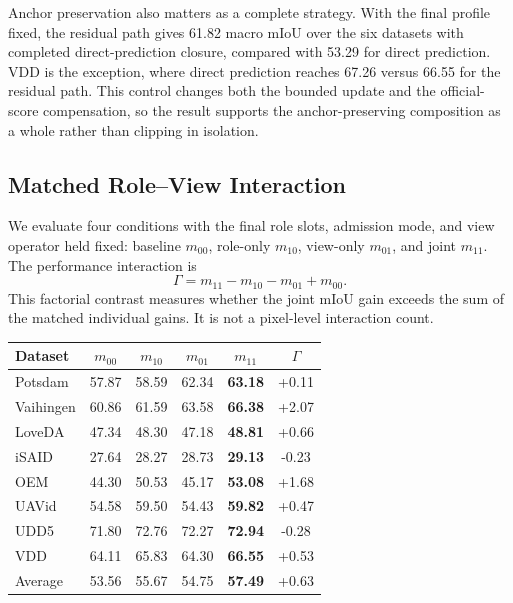 Anchor preservation also matters as a complete strategy. With the final profile fixed, the residual path gives 61.82 macro mIoU over the six datasets with completed direct-prediction closure, compared with 53.29 for direct prediction. VDD is the exception, where direct prediction reaches 67.26 versus 66.55 for the residual path. This control changes both the bounded update and the official-score compensation, so the result supports the anchor-preserving composition as a whole rather than clipping in isolation.

\subsection{Matched Role--View Interaction}

We evaluate four conditions with the final role slots, admission mode, and view operator held fixed: baseline $m_{00}$, role-only $m_{10}$, view-only $m_{01}$, and joint $m_{11}$. The performance interaction is
\begin{equation}
\Gamma=m_{11}-m_{10}-m_{01}+m_{00}.
\label{eq:interaction}
\end{equation}
This factorial contrast measures whether the joint mIoU gain exceeds the sum of the matched individual gains. It is not a pixel-level interaction count.

\begin{center}
\centering
\captionsetup{hypcap=false}
\label{tab:interaction}
\captionsetup{hypcap=true}
\small
\setlength{\tabcolsep}{3.5pt}
\begin{tabular}{lccccc}
\toprule
Dataset & $m_{00}$ & $m_{10}$ & $m_{01}$ & $m_{11}$ & $\Gamma$ \\
\midrule
Potsdam & 57.87 & 58.59 & 62.34 & \textbf{63.18} & +0.11 \\
Vaihingen & 60.86 & 61.59 & 63.58 & \textbf{66.38} & +2.07 \\
LoveDA & 47.34 & 48.30 & 47.18 & \textbf{48.81} & +0.66 \\
iSAID & 27.64 & 28.27 & 28.73 & \textbf{29.13} & -0.23 \\
OEM & 44.30 & 50.53 & 45.17 & \textbf{53.08} & +1.68 \\
UAVid & 54.58 & 59.50 & 54.43 & \textbf{59.82} & +0.47 \\
UDD5 & 71.80 & 72.76 & 72.27 & \textbf{72.94} & -0.28 \\
VDD & 64.11 & 65.83 & 64.30 & \textbf{66.55} & +0.53 \\
\midrule
Average & 53.56 & 55.67 & 54.75 & \textbf{57.49} & +0.63 \\
\bottomrule
\end{tabular}
\end{center}

